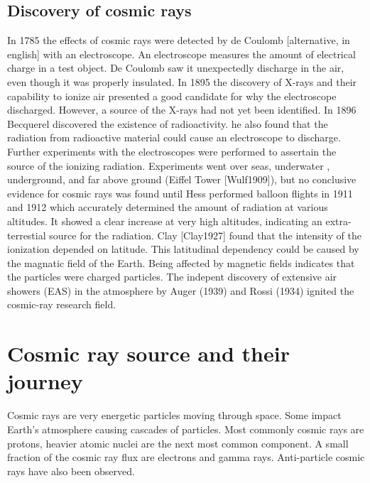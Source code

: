 
\subsection{Discovery of cosmic rays}

In 1785 the effects of cosmic rays were detected by de Coulomb \cite{coulomb1785electroscope} [alternative, in english] with an electroscope. An electroscope measures the amount of electrical charge in a test object. De Coulomb saw it unexpectedly discharge in the air, even though it was properly insulated. In 1895 the discovery of X-rays and their capability to ionize air \cite{roentgen1895radiation,flakus1981radiation} presented a good candidate for why the electroscope discharged. However, a source of the X-rays had not yet been identified. In 1896 Becquerel discovered the existence of radioactivity. he also found that the radiation from radioactive material could cause an electroscope to discharge. Further experiments with the electroscopes were performed to assertain the source of the ionizing radiation. Experiments went over seas, underwater \cite{pacini2011sea}, underground, and far above ground (Eiffel Tower [Wulf1909]), but no conclusive evidence for cosmic rays was found until Hess performed balloon flights in 1911 and 1912 which accurately determined the amount of radiation at various altitudes. It showed a clear increase at very high altitudes, indicating an extra-terrestial source for the radiation. Clay [Clay1927] found that the intensity of the ionization depended on latitude. This latitudinal dependency could be caused by the magnatic field of the Earth. Being affected by magnetic fields indicates that the particles were charged particles. The indepent discovery of extensive air showers (EAS) in the atmosphere by Auger (1939) \cite{auger1939eas} and Rossi (1934) ignited the cosmic-ray research field.


\section{Cosmic ray source and their journey}

Cosmic rays are very energetic particles moving through space. Some impact Earth's atmosphere causing cascades of particles. Most commonly cosmic rays are protons, heavier atomic nuclei are the next most common component. A small fraction of the cosmic ray flux are electrons and gamma rays. Anti-particle cosmic rays have also been observed.

